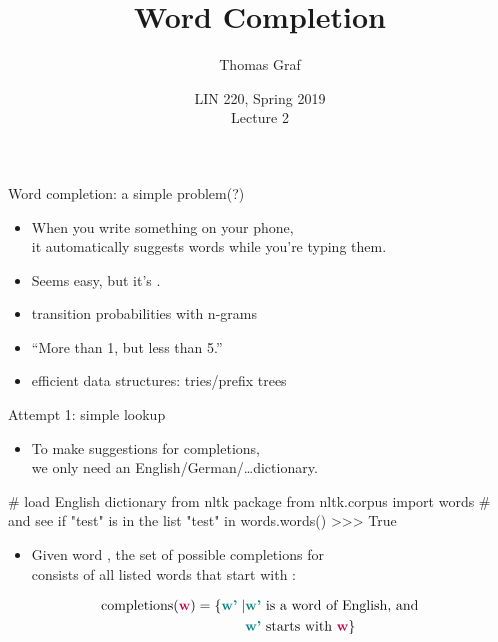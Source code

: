 \documentclass[professionalfonts, xcolor={usenames,svgnames,x11names,table}]{beamer}
\title{Word Completion}
\author{Thomas Graf}
\institute{Stony Brook University\\\texttt{lin220@thomasgraf.net}}
\date{LIN 220, Spring 2019\\Lecture 2}
\begin{document}
\unnumbered{
\begin{frame}
	\titlepage
\end{frame}
}

\begin{frame}{Word completion: a simple problem(?)}
    \begin{itemize}
        \item When you write something on your phone,\\
              it automatically suggests words while you're typing them.
        \item Seems easy, but it's .
    \end{itemize}

    \begin{lessons}
        \begin{itemize}
            \item transition probabilities with n-grams
            \item ``More than 1, but less than 5.''
            \item efficient data structures: tries\slash prefix trees
        \end{itemize}
    \end{lessons}
\end{frame}

\begin{frame}[fragile]{Attempt 1: simple lookup}
    \begin{itemize}
        \item To make suggestions for completions,\\
              we only need an English\slash German\slash\ldots dictionary.
    \end{itemize}

    \begin{pythoncode}
        # load English dictionary from nltk package
        from nltk.corpus import words
        # and see if "test" is in the list
        "test" in words.words()
        >>> True
    \end{pythoncode}

    \begin{itemize}
        \item Given word , the set of possible completions for \\
              consists of all listed words that start with :
    \end{itemize}

    \begin{align*}
        \text{completions}(\textbf{\color{purple}w}) = \{ \textbf{\color{teal}w'} \mid &
              \textbf{\color{teal}w'} \text{ is a word of English, and}\\
            & \textbf{\color{teal}w'} \text{ starts with } \textbf{\color{purple}w} \}
    \end{align*}
\end{frame}
\end{document}
